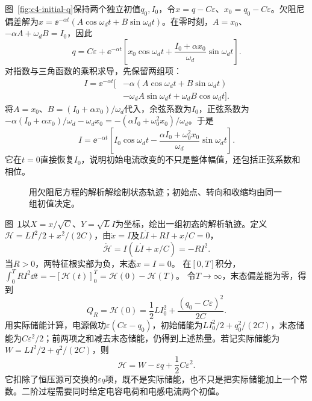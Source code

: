\begin{solution}
图~\ref{fig:c4-initial-q}保持两个独立初值$q_0,I_0$，令$x=q-C\varepsilon$、$x_0=q_0-C\varepsilon$。欠阻尼偏差解为$x=\ee^{-\alpha t}(A\cos\omega_dt+B\sin\omega_dt)$。在零时刻，$A=x_0$、$-\alpha A+\omega_dB=I_0$，因此
\[
 \boxed{q=C\varepsilon+\ee^{-\alpha t}
 \left[x_0\cos\omega_dt+\frac{I_0+\alpha x_0}{\omega_d}\sin\omega_dt\right]}.
\]
对指数与三角函数的乘积求导，先保留两组项：
\[
 \begin{aligned}
 I=\ee^{-\alpha t}\bigl[&-\alpha(A\cos\omega_dt+B\sin\omega_dt)\\
 &-\omega_dA\sin\omega_dt+\omega_dB\cos\omega_dt\bigr].
 \end{aligned}
\]
将$A=x_0$、$B=(I_0+\alpha x_0)/\omega_d$代入，余弦系数为$I_0$，正弦系数为
$-\alpha(I_0+\alpha x_0)/\omega_d-\omega_dx_0
=-(\alpha I_0+\omega_0^2x_0)/\omega_d$。于是
\[
 I=\ee^{-\alpha t}\left[I_0\cos\omega_dt
 -\frac{\alpha I_0+\omega_0^2x_0}{\omega_d}\sin\omega_dt\right].
\]
它在$t=0$直接恢复$I_0$，说明初始电流改变的不只是整体幅值，还包括正弦系数和相位。
\begin{figure}[H]\centering
{}
\caption{用欠阻尼方程的解析解绘制状态轨迹；初始点、转向和收缩均由同一组初值决定。}\label{fig:c4-initial-s}
\end{figure}
图~\ref{fig:c4-initial-s}以$X=x/\sqrt C$、$Y=\sqrt L I$为坐标，绘出一组初态的解析轨迹。定义$\mathcal H=LI^2/2+x^2/(2C)$，由$\dot x=I$及$L\dot I+RI+x/C=0$，
\[
 \dot{\mathcal H}=I(L\dot I+x/C)=-RI^2.
\]
当$R>0$，两特征根实部为负，末态$x=I=0$。
在$[0,T]$积分，$\int_0^T RI^2\dd t=-[\mathcal H(t)]_0^T=\mathcal H(0)-\mathcal H(T)$。
令$T\to\infty$，末态偏差能为零，得到
\[
 \boxed{Q_R=\mathcal H(0)=\frac12LI_0^2+
 \frac{(q_0-C\varepsilon)^2}{2C}}.
\]
用实际储能计算，电源做功$\varepsilon(C\varepsilon-q_0)$，初始储能为$LI_0^2/2+q_0^2/(2C)$，末态储能为$C\varepsilon^2/2$；前两项之和减去末态储能，仍得到上述热量。若记实际储能为$W=LI^2/2+q^2/(2C)$，则
\[
 \mathcal H=W-\varepsilon q+\frac12C\varepsilon^2.
\]
它扣除了恒压源可交换的$\varepsilon q$项，既不是实际储能，也不只是把实际储能加上一个常数。二阶过程需要同时给定电容电荷和电感电流两个初值。
\end{solution}

